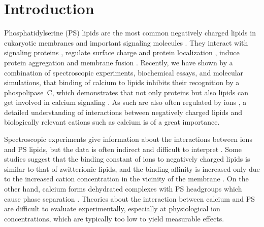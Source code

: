 \documentclass[journal=jpcbfk,manuscript=article]{achemso}
\begin{document}
 
 
 
\section{Introduction} 

Phosphatidylserine (PS) lipids are the most common negatively charged lipids in eukaryotic membranes
and important signaling molecules \cite{lemmon08,leventis10,li14}.
They interact with signaling proteins \cite{leventis10},
regulate surface charge and protein localization \cite{yeung08}, 
induce protein aggregation \cite{zhao04,gorbenko06} and membrane fusion \cite{wilschut1981calcium, papahadjopoulos90, verma2018cell}.
Recently, we have shown by a combination of spectroscopic experiments, biochemical essays, and molecular simulations, that binding of
calcium to  lipids inhibits their recognition by a phospolipase~C, 
which demonstrates that not only proteins but also lipids can get involved in calcium signaling \cite{Bilkova2017Calcium}.
As such  are also often regulated by ions \cite{leventis10},
a detailed understanding of interactions between negatively charged lipids and biologically relevant cations such as calcium is of a great importance.

Spectroscopic experiments give  
information about the
interactions between ions and PS lipids, but the data is often indirect and difficult to
interpret \cite{hauser77,kurland79,eisenberg79,hauser83,dluhy83,hauser85,feigenson86,mattai89,roux90,roux91}.
Some studies suggest that the
binding constant of ions to negatively charged lipids is similar to that of zwitterionic lipids,
and the binding affinity is increased only due to the increased cation
concentration in the vicinity of the membrane \cite{seelig90,sinn06}.
On the other hand, calcium forms dehydrated complexes with PS headgroups
which cause phase separation \cite{hauser77,kurland79,hauser85,feigenson86,mattai89,roux90,roux91,boettcher11}.
Theories about the interaction between calcium and PS 
are difficult to evaluate experimentally,
especially at physiological ion concentrations,
which are typically too low to yield measurable effects.
\end{document}
